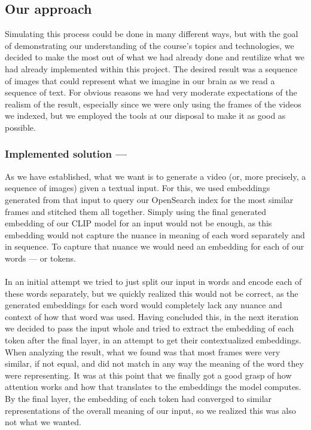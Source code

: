 \documentclass[runningheads]{llncs}
\begin{document}
\subsection{Our approach}

Simulating this process could be done in many different ways, but with the goal of demonstrating our understanding of the course's topics and technologies, we decided to make the most out of what we had already done and reutilize what we had already implemented within this project. The desired result was a sequence of images that could represent what we imagine in our brain as we read a sequence of text. For obvious reasons we had very moderate expectations of the realism of the result, especially since we were only using the frames of the videos we indexed, but we employed the tools at our disposal to make it as good as possible. %

\subsubsection{Implemented solution —}

As we have established, what we want is to generate a video (or, more precisely, a sequence of images) given a textual input. For this, we used embeddings generated from that input to query our OpenSearch index for the most similar frames and stitched them all together. Simply using the final generated embedding of our CLIP model for an input would not be enough, as this embedding would not capture the nuance in meaning of each word separately and in sequence. To capture that nuance we would need an embedding for each of our words — or tokens. 
\paragraph{}
In an initial attempt we tried to just split our input in words and encode each of these words separately, but we quickly realized this would not be correct, as the generated embeddings for each word would completely lack any nuance and context of how that word was used. Having concluded this, in the next iteration we decided to pass the input whole and tried to extract the embedding of each token after the final layer, in an attempt to get their contextualized embeddings. When analyzing the result, what we found was that most frames were very similar, if not equal, and did not match in any way the meaning of the word they were representing. It was at this point that we finally got a good grasp of how attention works and how that translates to the embeddings the model computes. By the final layer, the embedding of each token had converged to similar representations of the overall meaning of our input, so we realized this was also not what we wanted. 
\end{document}
